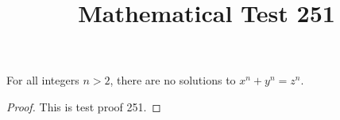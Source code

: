 \documentclass{amsart}
\begin{document}
\title{Mathematical Test 251}
\begin{theorem}
For all integers $n > 2$, there are no solutions to $x^n + y^n = z^n$.
\end{theorem}
\begin{proof}
This is test proof 251.
\end{proof}
\end{document}
